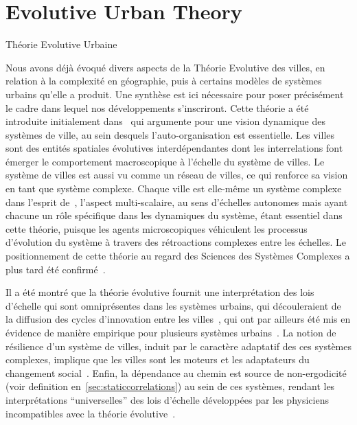 

\newpage


\section*{Evolutive Urban Theory}{Théorie Evolutive Urbaine}



Nous avons déjà évoqué divers aspects de la Théorie Evolutive des villes, en relation à la complexité en géographie, puis à certains modèles de systèmes urbains qu'elle a produit. Une synthèse est ici nécessaire pour poser précisément le cadre dans lequel nos développements s'inscriront. Cette théorie a été introduite initialement dans~\cite{pumain1997pour} qui argumente pour une vision dynamique des systèmes de ville, au sein desquels l'auto-organisation est essentielle. Les villes sont des entités spatiales évolutives interdépendantes dont les interrelations font émerger le comportement macroscopique à l'échelle du système de villes. Le système de villes est aussi vu comme un réseau de villes, ce qui renforce sa vision en tant que système complexe. Chaque ville est elle-même un système complexe dans l'esprit de~\cite{berry1964cities}, l'aspect multi-scalaire, au sens d'échelles autonomes mais ayant chacune un rôle spécifique dans les dynamiques du système, étant essentiel dans cette théorie, puisque les agents microscopiques véhiculent les processus d'évolution du système à travers des rétroactions complexes entre les échelles. Le positionnement de cette théorie au regard des Sciences des Systèmes Complexes a plus tard été confirmé~\cite{pumain2003approche}.

Il a été montré que la théorie évolutive fournit une interprétation des lois d'échelle qui sont omniprésentes dans les systèmes urbains, qui découleraient de la diffusion des cycles d'innovation entre les villes~\cite{pumain2006evolutionary}, qui ont par ailleurs été mis en évidence de manière empirique pour plusieurs systèmes urbains~\cite{pumain2009innovation}. La notion de résilience d'un système de villes, induit par le caractère adaptatif des ces systèmes complexes, implique que les villes sont les moteurs et les adaptateurs du changement social~\cite{pumain2010theorie}. Enfin, la dépendance au chemin est source de non-ergodicité (voir definition en~\ref{sec:staticcorrelations}) au sein de ces systèmes, rendant les interprétations ``universelles'' des lois d'échelle développées par les physiciens incompatibles avec la théorie évolutive~\cite{pumain2010theorie}.


